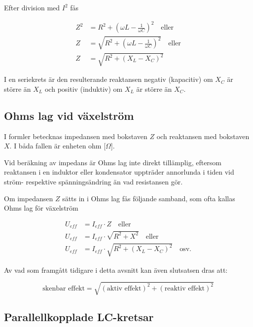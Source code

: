 Efter division med \(I^2\) fås

\begin{align*}
  Z^2 &= R^2 + ( \omega L - \frac{1}{\omega C} )^2 \quad \text{eller} \\
  Z &= \sqrt{R^2 + (\omega L - \frac{1}{\omega C})^2} \quad \text{eller} \\
  Z &= \sqrt{R^2 + (X_L - X_C)^2}
\end{align*}

I en seriekrets är den resulterande reaktansen negativ (kapacitiv) om \(X_C\) är
större än \(X_L\) och positiv (induktiv) om \(X_L\) är större än \(X_C\).

\subsection{Ohms lag vid växelström}

I formler betecknas impedansen med bokstaven \(Z\) och reaktansen med bokstaven
\(X\).
I båda fallen är enheten ohm [\(\Omega\)].

Vid beräkning av impedans är Ohms lag inte direkt tillämplig, eftersom
reaktansen i en induktor eller kondensator uppträder annorlunda i tiden vid
ström- respektive spänningsändring än vad resistansen gör.

Om impedansen \(Z\) sätts in i Ohms lag fås följande samband, som ofta kallas
Ohms lag för växelström

\begin{align*}
  U_{eff} &= I_{eff} \cdot Z \quad \text{eller} \\
  U_{eff} &= I_{eff} \cdot \sqrt{R^2 + X^2} \quad \text{eller} \\
  U_{eff} &= I_{eff} \cdot \sqrt{R^2 + (X_L - X_C)^2} \quad \text{osv.}
\end{align*}

Av vad som framgått tidigare i detta avsnitt kan även slutsatsen dras att:

\[
\text{skenbar effekt} = \sqrt{(\text{aktiv effekt})^2 + (\text{reaktiv effekt})^2}
\]

\subsection{Parallellkopplade LC-kretsar}



